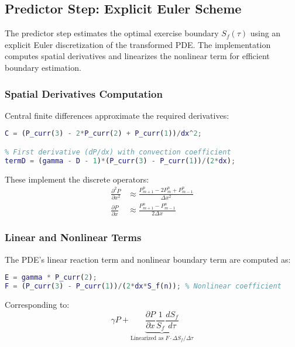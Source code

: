 \documentclass[12pt]{article}
\begin{document}
\subsection{Predictor Step: Explicit Euler Scheme}
\label{subsec:predictor}

The predictor step estimates the optimal exercise boundary \(S_f(\tau)\) using an explicit Euler discretization of the transformed PDE. The implementation computes spatial derivatives and linearizes the nonlinear term for efficient boundary estimation.

\subsubsection{Spatial Derivatives Computation}
Central finite differences approximate the required derivatives:

\begin{lstlisting}[language=Matlab,caption={Derivative calculations},label=code:derivs]
% Second derivative (d²P/dx²)
C = (P_curr(3) - 2*P_curr(2) + P_curr(1))/dx^2; 

% First derivative (dP/dx) with convection coefficient
termD = (gamma - D - 1)*(P_curr(3) - P_curr(1))/(2*dx); 
\end{lstlisting}

These implement the discrete operators:
\begin{align}
\frac{\partial^2 P}{\partial x^2} &\approx \frac{P_{m+1}^n - 2P_m^n + P_{m-1}^n}{\Delta x^2} \label{eq:diffusion}\\
\frac{\partial P}{\partial x} &\approx \frac{P_{m+1}^n - P_{m-1}^n}{2\Delta x} \label{eq:convection}
\end{align}

\subsubsection{Linear and Nonlinear Terms}
The PDE's linear reaction term and nonlinear boundary term are computed as:

\begin{lstlisting}[language=Matlab,caption={Term evaluations},label=code:terms]
E = gamma * P_curr(2);    
F = (P_curr(3) - P_curr(1))/(2*dx*S_f(n)); % Nonlinear coefficient
\end{lstlisting}

Corresponding to:
\begin{equation}
\gamma P + \underbrace{\frac{\partial P}{\partial x}\frac{1}{S_f}\frac{dS_f}{d\tau}}_{\text{Linearized as } F \cdot \Delta S_f/\Delta\tau} \label{eq:pde_terms}
\end{equation}
\end{document}
